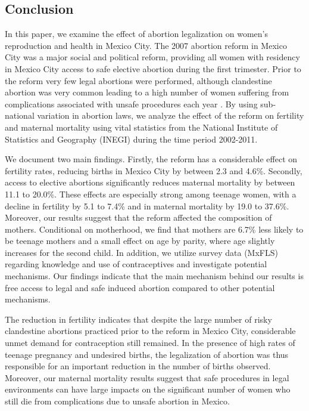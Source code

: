 \documentclass[a4paper, 11pt]{article}
\begin{document}
\begin{spacing}{2}
 
\section{Conclusion}\label{Conclusion}
In this paper, we examine the effect of abortion legalization on women's reproduction and health in Mexico City. The 2007 abortion reform in Mexico City was a major social and political reform, providing all women with residency in Mexico City access to safe elective abortion during the first trimester. Prior to the reform very few legal abortions were performed, although clandestine abortion was very common \citep{Becker2013} leading to a high number of women suffering from complications associated with unsafe procedures each year \citep{GIRE2009}. By using sub-national variation in abortion laws, we analyze the effect of the reform on fertility and maternal mortality using vital statistics from the National Institute of Statistics and Geography (INEGI) during the time period 2002-2011. 

We document two main findings. Firstly, the reform has a considerable effect on fertility rates, reducing births in Mexico City by between 2.3 and 4.6\%. Secondly, access to elective abortions significantly reduces maternal mortality by between 11.1 to 20.0\%. These effects are especially strong among teenage women, with a decline in fertility by 5.1 to 7.4\% and in maternal mortality by 19.0 to 37.6\%. Moreover, our results suggest that the reform affected the composition of mothers. Conditional on motherhood, we find that mothers are 6.7\% less likely to be teenage mothers and a small effect on age by parity, where age slightly increases for the second child. In addition, we utilize survey data (MxFLS) regarding knowledge and use of contraceptives and investigate potential mechanisms. Our findings indicate that the main mechanism behind our results is free access to legal and safe induced abortion compared to other potential mechanisms.
 
The reduction in fertility indicates that despite the large number of risky clandestine abortions practiced prior to the reform in Mexico City, considerable unmet demand for contraception still remained. In the presence of high rates of teenage pregnancy and undesired births, the legalization of abortion was thus responsible for an important reduction in the number of births observed. Moreover, our maternal mortality results suggest that safe procedures in legal environments can have large impacts on the significant number of women who still die from complications due to unsafe abortion in Mexico. 


\end{spacing}
\end{document}
